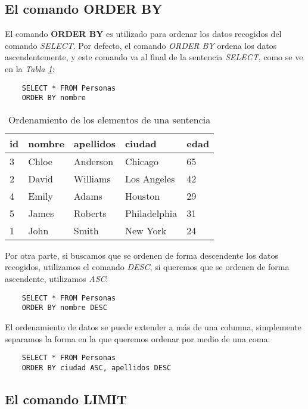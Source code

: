 \subsection{El comando ORDER BY}

El comando \textbf{ORDER BY} es utilizado para ordenar los datos recogidos del comando \textit{SELECT}. Por defecto, el comando \textit{ORDER BY} ordena los datos ascendentemente, y este comando va al final de la sentencia \textit{SELECT}, como se ve en la \textit{Tabla \ref{tab: 4}}:
\begin{lstlisting}
    SELECT * FROM Personas
    ORDER BY nombre
\end{lstlisting}
\begin{table}[H]
    \centering
    \caption{Ordenamiento de los elementos de una sentencia}
    \label{tab: 4}
    \begin{tabular}{|l|l|l|l|l|}
        \hline
        \textbf{id} & \textbf{nombre} & \textbf{apellidos} & \textbf{ciudad} & \textbf{edad} \\
        \hline
        3 & Chloe   & Anderson  & Chicago       & 65 \\
        \hline
        2 & David   & Williams  & Los Angeles   & 42 \\
        \hline
        4 & Emily   & Adams     & Houston       & 29 \\
        \hline
        5 & James   & Roberts   & Philadelphia  & 31 \\
        \hline
        1 & John    & Smith     & New York      & 24 \\
        \hline
    \end{tabular}
\end{table}

Por otra parte, si buscamos que se ordenen de forma descendente los datos recogidos, utilizamos el comando \textit{DESC}, si queremos que se ordenen de forma ascendente, utilizamos \textit{ASC}:
\begin{lstlisting}
    SELECT * FROM Personas
    ORDER BY nombre DESC
\end{lstlisting}

El ordenamiento de datos se puede extender a más de una columna, simplemente separamos la forma en la que queremos ordenar por medio de una coma:
\begin{lstlisting}
    SELECT * FROM Personas
    ORDER BY ciudad ASC, apellidos DESC
\end{lstlisting}


\subsection{El comando LIMIT}

